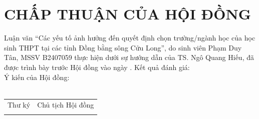 \chapter*{CHẤP THUẬN CỦA HỘI ĐỒNG}\thispagestyle{empty}
Luận văn ``Các yếu tố ảnh hưởng đến quyết định chọn trường/ngành học của học sinh THPT tại các tỉnh Đồng bằng sông Cửu Long'', do sinh viên Phạm Duy Tân, MSSV B2407059 thực hiện dưới sự hướng dẫn của TS. Ngô Quang Hiếu, đã được trình bày trước Hội đồng vào ngày \dotfill.
\vspace{1cm}
\noindent Kết quả đánh giá: \dotfill\\[0.6cm]
\noindent Ý kiến của Hội đồng: \dotfill\\[0.5cm]\dotfill\\[0.5cm]\dotfill
\vfill
\noindent\begin{tabularx}{\textwidth}{>{\centering\arraybackslash}X >{\centering\arraybackslash}X}
Thư ký & Chủ tịch Hội đồng\\[2.5cm]
\dotfill & \dotfill
\end{tabularx}
